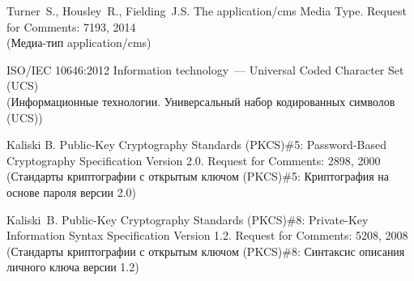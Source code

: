 \begin{thebibliography}{9}
Turner~S., Housley~R., Fielding~J.S.  
The application/cms Media Type. 
Request for Comments: 7193, 2014\\ 
{\small (Медиа-тип application/cms)}

ISO/IEC 10646:2012 Information technology~--- Universal Coded Character 
Set (UCS)\\
{\small (Информационные технологии. Универсальный набор кодированных 
символов (UCS))}

Kaliski B. 
Public-Key Cryptography Standards (PKCS)\#5: 
Password-Based Cryptography Specification Version 2.0. 
Request for Comments: 2898, 2000\\ 
{\small (Стандарты криптографии с открытым ключом (PKCS)\#5: 
Криптография на основе пароля версии 2.0)}  

Kaliski~B. 
Public-Key Cryptography Standards (PKCS)\#8: 
Private-Key Information Syntax Specification Version 1.2. 
Request for Comments: 5208, 2008\\ 
{\small (Стандарты криптографии с открытым ключом (PKCS)\#8: 
Синтаксис описания личного ключа версии 1.2)}  
\label{LastBib}
\end{thebibliography}

